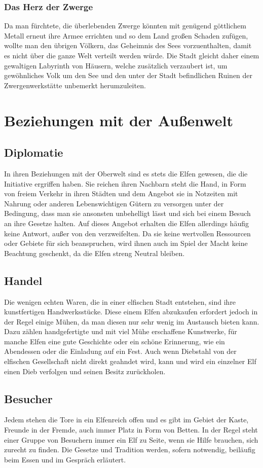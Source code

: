 \documentclass[a4paper,12pt,oneside]{book}
\begin{document}
\section{Das Herz der Zwerge}
Da man fürchtete, die überlebenden Zwerge könnten mit genügend göttlichem Metall erneut ihre Armee errichten und so dem Land großen Schaden zufügen, wollte man den übrigen Völkern, das Geheimnis des Sees vorzuenthalten, damit es nicht über die ganze Welt verteilt werden würde. Die Stadt gleicht daher einem gewaltigen Labyrinth von Häusern, welche zusätzlich verzaubert ist, um gewöhnliches Volk um den See und den unter der Stadt befindlichen Ruinen der Zwergenwerkstätte unbemerkt herumzuleiten. 


\part{Beziehungen mit der Außenwelt}
\chapter{Diplomatie}
In ihren Beziehungen mit der Oberwelt sind es stets die Elfen gewesen, die die Initiative ergriffen haben. Sie reichen ihren Nachbarn steht die Hand, in Form von freiem Verkehr in ihren Städten und dem Angebot sie in Notzeiten mit Nahrung oder anderen Lebenswichtigen Gütern zu versorgen unter der Bedingung, dass man sie ansonsten unbehelligt lässt und sich bei einem Besuch an ihre Gesetze halten. Auf dieses Angebot erhalten die Elfen allerdings häufig keine Antwort, außer von den verzweifelten. Da sie keine wertvollen Ressourcen oder Gebiete für sich beanspruchen, wird ihnen auch im Spiel der Macht keine Beachtung geschenkt, da die Elfen streng Neutral bleiben.
\chapter{Handel}
Die wenigen echten Waren, die in einer elfischen Stadt entstehen, sind ihre kunstfertigen Handwerksstücke. Diese einem Elfen abzukaufen erfordert jedoch in der Regel einige Mühen, da man diesen nur sehr wenig im Austausch bieten kann. Dazu zählen handgefertigte und mit viel Mühe erschaffene Kunstwerke, für manche Elfen eine gute Geschichte oder ein schöne Erinnerung, wie ein Abendessen oder die Einladung auf ein Fest. Auch wenn Diebstahl von der elfischen Gesellschaft nicht direkt geahndet wird, kann und wird ein einzelner Elf einen Dieb verfolgen und seinen Besitz zurückholen. 
\chapter{Besucher}
Jedem stehen die Tore in ein Elfenreich offen und es gibt im Gebiet der Kaste, Freunde in der Fremde, auch immer Platz in Form von Betten. In der Regel steht einer Gruppe von Besuchern immer ein Elf zu Seite, wenn sie Hilfe brauchen, sich zurecht zu finden. Die Gesetze und Tradition werden, sofern notwendig, beiläufig beim Essen und im Gespräch erläutert. 
\end{document}
